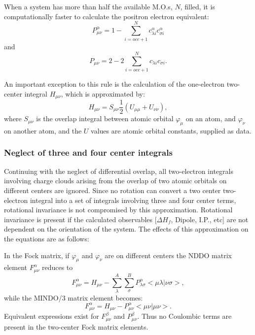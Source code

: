 \documentclass[a4paper]{book}
\begin{document}
When a system has more than half the available M.O.s, $N$,  filled, it
is computationally
faster to calculate the positron electron equivalent:
$$
     P_{\mu\nu}^{\alpha} = 1-\! \sum_{i=occ+1}^Nc_{\lambda i}^{\alpha}c_{\sigma  i}^{\alpha}
$$
and
$$
     P_{\mu\nu} = 2-\! 2\sum_{i=occ+1}^Nc_{\lambda i}c_{\sigma  i}.
$$

An important exception to this rule is the calculation of the one-electron
two-center integral $H_{\mu\nu}$, which is approximated by:
$$
H_{\mu\nu}= S_{\mu\nu}\frac{1}{2}(U_{\mu\mu}+U_{\nu\nu}),
$$
where $S_{\mu\nu}$ is the overlap integral between atomic orbital $\varphi_{\mu}$
on an atom, and  $\varphi_{\nu}$ on another atom, and the $U$ values are
atomic orbital constants, supplied as data.

\subsubsection{Neglect of three and four center integrals}\label{34}
Continuing with the neglect of differential overlap, all two-electron integrals
involving charge clouds arising from the overlap of two atomic orbitals on
different centers are ignored. Since no rotation can convert a two center
two-electron integral into a set of integrals involving three and four center
terms, rotational invariance is not compromised by this approximation.
Rotational invariance is present if the calculated observables [$\Delta H_f$,
Dipole, I.P., etc] are not dependent on the orientation of the system. The
effects of this approximation on the  equations are as follows:

In the Fock matrix, if $\varphi_{\mu}$ and $\varphi_{\nu}$ are on different
centers the NDDO matrix element $F_{\mu\nu}^{\alpha}$ reduces to
$$
 F_{\mu\nu}^{\alpha} = H_{\mu\nu}- \sum_{\lambda}^A\sum_{\sigma}^B
P_{\lambda\sigma}^{\alpha} <\mu\lambda|\nu\sigma>,
$$
while the MINDO/3 matrix element becomes:
$$
 F_{\mu\nu}^{\alpha} = H_{\mu\nu}- P_{\mu\nu}^{\alpha} <\mu\nu|\mu\nu>.
$$
Equivalent expressions exist for  $F_{\mu\nu}^{\beta}$ and
$P_{\mu\nu}^{\beta}$. Thus no Coulombic terms are present in the two-center
Fock matrix elements.
\end{document}
